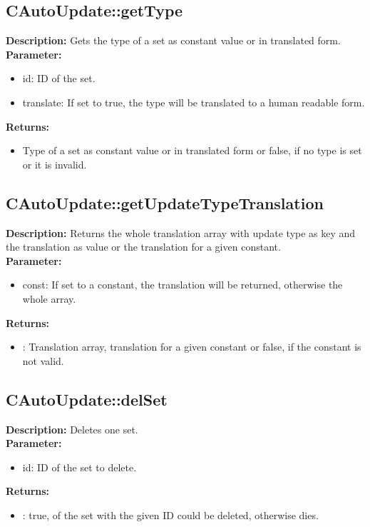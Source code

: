 \subsection{CAutoUpdate::getType}
\textbf{Description:} Gets the type of a set as constant value or in translated form.\\
\textbf{Parameter:}
\begin{itemize}
\item id: ID of the set.
\item translate: If set to true, the type will be translated to a human readable form.
\end{itemize}
\textbf{Returns:}
\begin{itemize}
\item Type of a set as constant value or in translated form or false, if no type is set or it is invalid.
\end{itemize}

\subsection{CAutoUpdate::getUpdateTypeTranslation}
\textbf{Description:} Returns the whole translation array with update type as key and the translation as value or the translation for a given constant.\\
\textbf{Parameter:}
\begin{itemize}
\item const: If set to a constant, the translation will be returned, otherwise the whole array.
\end{itemize}
\textbf{Returns:}
\begin{itemize}
\item : Translation array, translation for a given constant or false, if the constant is not valid.
\end{itemize}

\subsection{CAutoUpdate::delSet}
\textbf{Description:} Deletes one set.\\
\textbf{Parameter:}
\begin{itemize}
\item id: ID of the set to delete.
\end{itemize}
\textbf{Returns:}
\begin{itemize}
\item : true, of the set with the given ID could be deleted, otherwise dies.
\end{itemize}

